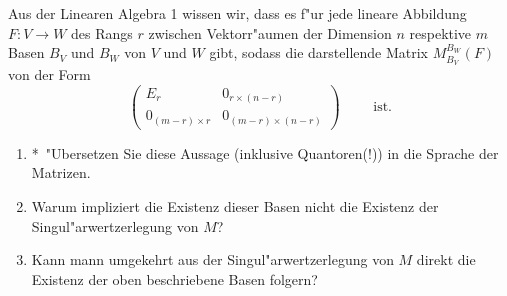 \documentclass[a4,11pt]{article}
\newcommand{\bonusitem}{\item\hspace*{-2.4mm}*\ }
\begin{document}
\vspace*{-17mm}
{
\kopf
}



\begin{aufgabe}[4 Punkte]
Aus der Linearen Algebra 1 wissen wir, dass es f"ur jede lineare
Abbildung $F : V \to W$ des Rangs $r$ zwischen Vektorr"aumen der
Dimension $n$ respektive $m$ Basen $B_V$ und $B_W$ von $V$ und $W$
gibt, sodass die darstellende Matrix $M_{B_V}^{B_W}(F)$ von der Form
$$ \left( \begin{smallmatrix}
    E_r & 0_{r \times (n-r)} \\
    0_{(m-r) \times r} & 0_{(m-r) \times (n-r)}
  \end{smallmatrix} \right) \qquad \text{ ist.}$$
\begin{enumerate}
\addtocounter{enumi}{-1}
\bonusitem "Ubersetzen Sie diese Aussage (inklusive Quantoren(!)) in
die Sprache der Matrizen.
\item
Warum impliziert die Existenz dieser Basen nicht die Existenz der
Singul"arwertzerlegung von $M$?
\item
Kann mann umgekehrt aus der Singul"arwertzerlegung von $M$ direkt die
Existenz der oben beschriebene Basen folgern?
\end{enumerate}
\end{aufgabe}
\end{document}
